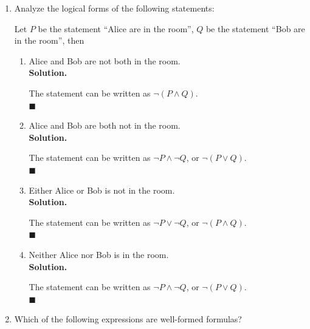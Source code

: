\documentclass{report}
\newcommand{\sol}{\vspace{1em}\\\textbf{Solution.}\vspace{0.5em}}
\newcommand{\qed}{‎\\‎\hfill$\blacksquare$\vspace{1em}}
\begin{document}
\begin{enumerate}[leftmargin=*]
\begin{enumerate}
                    Let $P$ be the statement ``I'll have fish'', $Q$ be the statement ``I'll have
                    chicken'', $R$ be the statement ``I'll have mashed potatoes'', then the
                    statement can be written as $(P \vee Q) \wedge \neg(P \wedge R)$. \qed

              \item 3 is a common divisor of 6,9, and 15.
                    \sol{}

                    Let $P(n)$ be the statement ``3 is a divisor of $n$'', then the statement can
                    be written as $P(6) \wedge P(9) \wedge P(15)$. \qed
          \end{enumerate}

    \item  Analyze the logical forms of the following statements:

          Let $P$ be the statement ``Alice are in the room'', $Q$ be the statement ``Bob
          are in the room'', then
          \begin{enumerate}
              \item Alice and Bob are not both in the room. \sol{}

                    The statement can be written as $\neg(P \wedge Q)$. \qed

              \item Alice and Bob are both not in the room. \sol{}

                    The statement can be written as $\neg P \wedge \neg Q$, or $\neg(P \vee Q)$.
                    \qed

              \item Either Alice or Bob is not in the room. \sol{}

                    The statement can be written as $\neg P \vee \neg Q$, or $\neg(P \wedge Q)$.
                    \qed

              \item Neither Alice nor Bob is in the room. \sol{}

                    The statement can be written as $\neg P \wedge \neg Q$, or $\neg(P \vee Q)$.
                    \qed
          \end{enumerate}

    \item  Which of the following expressions are well-formed formulas?
          \begin{enumerate}
              \setlength{\columnsep}{1cm}
\end{enumerate}
\end{enumerate}
\end{document}
